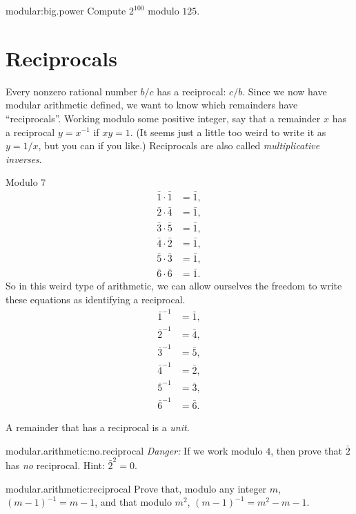 \begin{problem}{modular:big.power}
Compute \(2^{100}\) modulo \(125\).
\end{problem}


\section{Reciprocals}

Every nonzero rational number \(b/c\) has a reciprocal: \(c/b\).
Since we now have modular arithmetic defined, we want to know which remainders have ``reciprocals''.
Working modulo some positive integer, say that a remainder \(x\) has a reciprocal \(y=x^{-1}\) if \(xy=1\).
(It seems just a little too weird to write it as \(y=1/x\), but you can if you like.)
Reciprocals are also called \emph{multiplicative inverses}.
\begin{example}
Modulo \(7\)
\begin{align*}
\bar{1} \cdot \bar{1} &= \bar{1}, \\
\bar{2} \cdot \bar{4} &= \bar{1}, \\
\bar{3} \cdot \bar{5} &= \bar{1}, \\
\bar{4} \cdot \bar{2} &= \bar{1}, \\
\bar{5} \cdot \bar{3} &= \bar{1}, \\
\bar{6} \cdot \bar{6} &= \bar{1}.
\end{align*}
So in this weird type of arithmetic, we can allow ourselves the freedom to write these equations as identifying a reciprocal.
\begin{align*}
\bar{1}^{-1} &= \bar{1}, \\
\bar{2}^{-1} &= \bar{4}, \\
\bar{3}^{-1} &= \bar{5}, \\
\bar{4}^{-1} &= \bar{2}, \\
\bar{5}^{-1} &= \bar{3}, \\
\bar{6}^{-1} &= \bar{6}.
\end{align*}
\end{example}
A remainder that has a reciprocal is a \emph{unit}.

\begin{problem}{modular.arithmetic:no.reciprocal}
\emph{Danger:} If we work modulo \(4\), then prove that \(\bar{2}\) has \emph{no} reciprocal.
Hint: \(\bar{2}^2=0\).
\end{problem}

\begin{problem}{modular.arithmetic:reciprocal}
Prove that, modulo any integer \(m\), \((m-1)^{-1}=m-1\), and that modulo \(m^2\), \((m-1)^{-1}=m^2-m-1\).
\end{problem}

